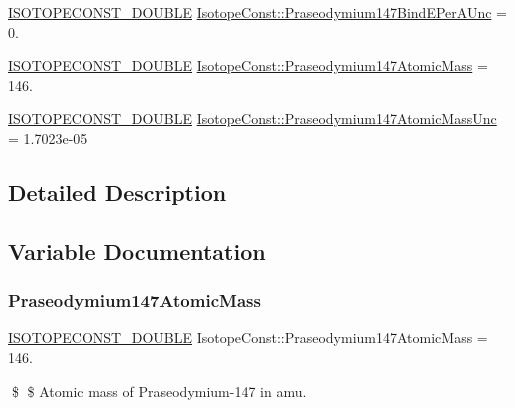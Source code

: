 \begin{DoxyCompactItemize}
\item 
\mbox{\hyperlink{group___isotope_const-_macros_ga8f45a7272ce02c0b4c65c44636ed719a}{I\+S\+O\+T\+O\+P\+E\+C\+O\+N\+S\+T\+\_\+\+D\+O\+U\+B\+LE}} \mbox{\hyperlink{group___isotope_const-_praseodymium-_pr147_ga7f1401044fbdf26d657c4493a27b3ab1}{Isotope\+Const\+::\+Praseodymium147\+Bind\+E\+Per\+A\+Unc}} = 0.
\item 
\mbox{\hyperlink{group___isotope_const-_macros_ga8f45a7272ce02c0b4c65c44636ed719a}{I\+S\+O\+T\+O\+P\+E\+C\+O\+N\+S\+T\+\_\+\+D\+O\+U\+B\+LE}} \mbox{\hyperlink{group___isotope_const-_praseodymium-_pr147_gabadd10f6697752d7c085b24c3e1f2145}{Isotope\+Const\+::\+Praseodymium147\+Atomic\+Mass}} = 146.
\item 
\mbox{\hyperlink{group___isotope_const-_macros_ga8f45a7272ce02c0b4c65c44636ed719a}{I\+S\+O\+T\+O\+P\+E\+C\+O\+N\+S\+T\+\_\+\+D\+O\+U\+B\+LE}} \mbox{\hyperlink{group___isotope_const-_praseodymium-_pr147_gae4e4e894e9902c6947250a48d34f9e5d}{Isotope\+Const\+::\+Praseodymium147\+Atomic\+Mass\+Unc}} = 1.\+7023e-\/05
\end{DoxyCompactItemize}


\subsection{Detailed Description}


\subsection{Variable Documentation}
\mbox{\label{group___isotope_const-_praseodymium-_pr147_gabadd10f6697752d7c085b24c3e1f2145}} 
\subsubsection{\texorpdfstring{Praseodymium147\+Atomic\+Mass}{Praseodymium147AtomicMass}}
{\footnotesize\ttfamily \mbox{\hyperlink{group___isotope_const-_macros_ga8f45a7272ce02c0b4c65c44636ed719a}{I\+S\+O\+T\+O\+P\+E\+C\+O\+N\+S\+T\+\_\+\+D\+O\+U\+B\+LE}} Isotope\+Const\+::\+Praseodymium147\+Atomic\+Mass = 146.}

\$ \$ Atomic mass of Praseodymium-\/147 in amu. \mbox{\label{group___isotope_const-_praseodymium-_pr147_gae4e4e894e9902c6947250a48d34f9e5d}} 
